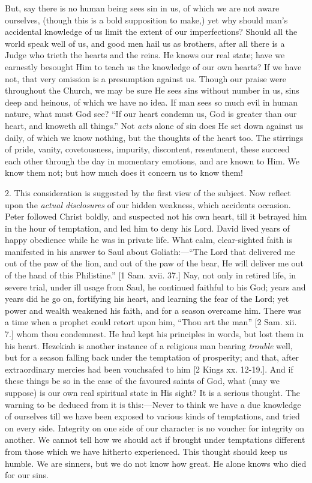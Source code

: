 But, say there is no human being sees sin in us, of
which we are not aware ourselves, (though this is a bold
supposition to make,) yet why should man's accidental
knowledge of us limit the extent of our imperfections?
Should all the world speak well of us, and good men hail
us as brothers, after all there is a Judge who trieth the
hearts and the reins. He knows our real state; have we
earnestly besought Him to teach us the knowledge of our
own hearts? If we have not, that very omission is a
presumption against us. Though our praise were throughout
the Church, we may be sure He sees sins without number in
us, sins deep and heinous, of which we have no idea. If
man sees so much evil in human nature, what must God see?
``If our heart condemn us, God is greater than our
heart, and knoweth all things.'' Not \emph{acts}
alone of sin does He set down against us daily, of which
we know nothing, but the thoughts of the heart too. The
stirrings of pride, vanity, covetousness, impurity,
discontent, resentment, these succeed each other through
the day in momentary emotions, and are known to Him. We
know them not; but how much does it concern us to know
them!

2. This consideration is suggested by the first view
of the subject. Now reflect upon the \emph{actual
disclosures} of our hidden weakness, which accidents
occasion. Peter followed Christ boldly, and suspected not
his own heart, till it betrayed him in the hour of
temptation, and led him to deny his Lord. David lived
years of happy obedience while he was in private life.
What calm, clear-sighted faith is manifested in his
answer to Saul about Goliath:—``The Lord that
delivered me out of the paw of the lion, and out of the
paw of the bear, He will deliver me out of the hand of
this Philistine.'' [1 Sam. xvii. 37.] Nay, not only
in retired life, in severe trial, under ill usage from
Saul, he continued faithful to his God; years and years
did he go on, fortifying his heart, and learning the fear
of the Lord; yet power and wealth weakened his faith, and
for a season overcame him. There was a time when a
prophet could retort upon him, ``Thou art the
man'' [2 Sam. xii. 7.] whom thou condemnest. He had
kept his principles in words, but lost them in his heart.
Hezekiah is another instance of a religious man bearing \emph{trouble}
well, but for a season falling back under the temptation
of prosperity; and that, after extraordinary mercies had
been vouchsafed to him [2 Kings xx. 12-19.]. And if these
things be so in the case of the favoured saints of God,
what (may we suppose) is our own real spiritual state in
His sight? It is a serious thought. The warning to be
deduced from it is this:—Never to think we have a
due knowledge of ourselves till we have been exposed to
various kinds of temptations, and tried on every side.
Integrity on one side of our character is no voucher for
integrity on another. We cannot tell how we should act if
brought under temptations different from those which we
have hitherto experienced. This thought should keep us
humble. We are sinners, but we do not know how great. He
alone knows who died for our sins.

